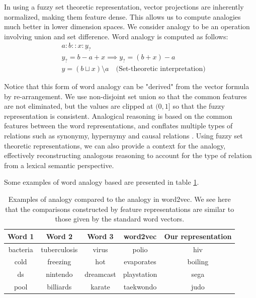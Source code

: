\documentclass[11pt]{book}
\newcommand{\citep}[1]{\cite{#1}}
\begin{document}
In using a fuzzy set theoretic representation, vector projections are
inherently normalized, making them feature dense. This allows us to compute
analogies much better in lower dimension spaces. We consider analogy to be an
operation involving union and set difference. Word analogy is computed as
follows:
\begin{equation*}
\begin{split}
    &a : b :: x : y_? \\
    &y_? = b - a + x \implies y_? = (b + x) - a \\
    &y = (b \sqcup x) \setminus a \quad \text{(Set-theoretic interpretation)}
\end{split}
\end{equation*}

Notice that this form of word analogy can be "derived" from the vector formula
by re-arrangement. We use non-disjoint set union so that the common features
are not eliminated, but the values are clipped at $(0,1]$ so that the fuzzy
representation is consistent. Analogical reasoning is based on the common
features between the word representations, and conflates multiple types of
relations such as synonymy, hypernymy and causal relations
\citep{chen2017evaluating}. Using fuzzy set theoretic representations, we can
also provide a context for the analogy, effectively reconstructing analogous
reasoning to account for the type of relation from a lexical semantic
perspective.

Some examples of word analogy based are presented in table \ref{tab: analogy}.

\begin{table}[]
    \centering
    \begin{tabular}{ccc|c|c}
        \bf Word 1  & \bf Word 2    & \bf Word 3    & \bf word2vec  & \bf Our representation    \\ \hline
        bacteria    & tuberculosis  & virus         & polio         & hiv                       \\
        cold        & freezing      & hot           & evaporates    & boiling                   \\
        ds          & nintendo      & dreamcast     & playstation   & sega                      \\
        pool        & billiards     & karate        & taekwondo     & judo                      \\
    \end{tabular}
    \caption{Examples of analogy compared to the analogy in word2vec. We see here that the comparisons constructed by feature representations are similar to those given by the standard word vectors.}
    \label{tab: analogy}
\end{table}
\end{document}
